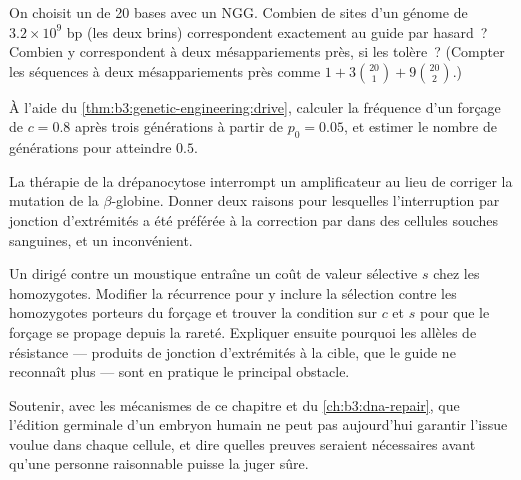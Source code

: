\begin{exercise}[$\star\star$]\label{exo:b3:genetic-engineering:8}
On choisit un  de 20 bases avec un  NGG. Combien de sites
d'un génome de $3.2\times 10^{9}$ bp (les deux brins) correspondent
exactement au guide par hasard~? Combien y correspondent à deux
mésappariements près, si  les tolère~? (Compter les séquences à
deux mésappariements près comme $1 + 3\binom{20}{1} +
9\binom{20}{2}$.)
\end{exercise}

\begin{exercise}[$\star\star$]\label{exo:b3:genetic-engineering:9}
À l'aide du \cref{thm:b3:genetic-engineering:drive}, calculer la
fréquence d'un forçage de $c = 0.8$ après trois générations à partir de
$p_{0} = 0.05$, et estimer le nombre de générations pour atteindre
$0.5$.
\end{exercise}

\begin{exercise}[$\star\star\star$]\label{exo:b3:genetic-engineering:10}
La thérapie de la drépanocytose interrompt un amplificateur au lieu de
corriger la mutation de la $\beta$-globine. Donner deux raisons pour
lesquelles l'interruption par jonction d'extrémités a été préférée à la
correction par  dans des cellules souches
sanguines, et un inconvénient.
\end{exercise}

\begin{exercise}[$\star\star\star$]\label{exo:b3:genetic-engineering:11}
Un  dirigé contre un moustique entraîne un coût de
valeur sélective $s$ chez les homozygotes. Modifier la récurrence pour
y inclure la sélection contre les homozygotes porteurs du forçage et
trouver la condition sur $c$ et $s$ pour que le forçage se propage
depuis la rareté. Expliquer ensuite pourquoi les allèles de résistance
--- produits de jonction d'extrémités à la cible, que le guide ne
reconnaît plus --- sont en pratique le principal obstacle.
\end{exercise}

\begin{exercise}[$\star\star\star$]\label{exo:b3:genetic-engineering:12}
Soutenir, avec les mécanismes de ce chapitre et du
\cref{ch:b3:dna-repair}, que l'édition germinale d'un embryon humain ne
peut pas aujourd'hui garantir l'issue voulue dans chaque cellule, et
dire quelles preuves seraient nécessaires avant qu'une personne
raisonnable puisse la juger sûre.
\end{exercise}

